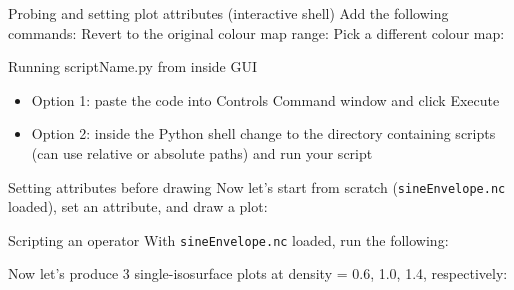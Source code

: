 \begin{frame}{Probing and setting plot attributes (interactive shell)}
  Add the following commands:
  \setMinMax
  \pause
  Revert to the original colour map range:
  \cancelMinMax
  \pause
  Pick a different colour map:
  \greens
\end{frame}


\begin{frame}{Running scriptName.py from inside GUI}
  \begin{itemize}\setlength{\itemsep}{3mm}
  \item Option 1: paste the code into Controls \ra Command window and click Execute
  \item Option 2: inside the Python shell change to the directory containing scripts (can use relative or
    absolute paths) and run your script
    \runScript
  \end{itemize}
\end{frame}

\begin{frame}{Setting attributes before drawing}
  Now let's start from scratch (\texttt{sineEnvelope.nc} loaded), set an attribute, and draw a plot:
  
\end{frame}

\begin{frame}{Scripting an operator}
  With \texttt{sineEnvelope.nc} loaded, run the following:
  
  \pause\bigskip
  {\small Now let's produce 3 single-isosurface plots at density = 0.6, 1.0, 1.4, respectively:}
  
\end{frame}


